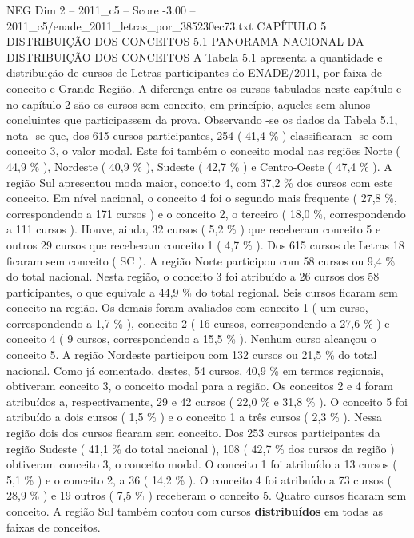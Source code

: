 \begin{textsample}{NEG Dim 2 – 2011\_c5 – Score -3.00 – 2011\_c5/enade\_2011\_letras\_por\_385230ec73.txt}  \label{ex:f2_neg_083}
CAPÍTULO 5 DISTRIBUIÇÃO DOS CONCEITOS 5.1 PANORAMA NACIONAL DA DISTRIBUIÇÃO DOS CONCEITOS A Tabela 5.1 apresenta a quantidade e distribuição de cursos de Letras participantes do ENADE/2011, por faixa de conceito e Grande Região.
A diferença entre os cursos tabulados neste capítulo e no capítulo 2 são os cursos sem conceito, em princípio, aqueles sem alunos concluintes que participassem da prova.
Observando -se os dados da Tabela 5.1, nota -se que, dos 615 cursos participantes, 254 ( 41,4 \% ) classificaram -se com conceito 3, o valor modal.
Este foi também o conceito modal nas regiões Norte ( 44,9 \% ), Nordeste ( 40,9 \% ), Sudeste ( 42,7 \% ) e Centro-Oeste ( 47,4 \% ).
A região Sul apresentou moda maior, conceito 4, com 37,2 \% dos cursos com este conceito.
Em nível nacional, o conceito 4 foi o segundo mais frequente ( 27,8 \%, correspondendo a 171 cursos ) e o conceito 2, o terceiro ( 18,0 \%, correspondendo a 111 cursos ).
Houve, ainda, 32 cursos ( 5,2 \% ) que receberam conceito 5 e outros 29 cursos que receberam conceito 1 ( 4,7 \% ).
Dos 615 cursos de Letras 18 ficaram sem conceito ( SC ).
A região Norte participou com 58 cursos ou 9,4 \% do total nacional.
Nesta região, o conceito 3 foi atribuído a 26 cursos dos 58 participantes, o que equivale a 44,9 \% do total regional.
Seis cursos ficaram sem conceito na região.
Os demais foram avaliados com conceito 1 ( um curso, correspondendo a 1,7 \% ), conceito 2 ( 16 cursos, correspondendo a 27,6 \% ) e conceito 4 ( 9 cursos, correspondendo a 15,5 \% ).
Nenhum curso alcançou o conceito 5.
A região Nordeste participou com 132 cursos ou 21,5 \% do total nacional.
Como já comentado, destes, 54 cursos, 40,9 \% em termos regionais, obtiveram conceito 3, o conceito modal para a região.
Os conceitos 2 e 4 foram atribuídos a, respectivamente, 29 e 42 cursos ( 22,0 \% e 31,8 \% ).
O conceito 5 foi atribuído a dois cursos ( 1,5 \% ) e o conceito 1 a três cursos ( 2,3 \% ).
Nessa região dois dos cursos ficaram sem conceito.
Dos 253 cursos participantes da região Sudeste ( 41,1 \% do total nacional ), 108 ( 42,7 \% dos cursos da região ) obtiveram conceito 3, o conceito modal.
O conceito 1 foi atribuído a 13 cursos ( 5,1 \% ) e o conceito 2, a 36 ( 14,2 \% ).
O conceito 4 foi atribuído a 73 cursos ( 28,9 \% ) e 19 outros ( 7,5 \% ) receberam o conceito 5.
Quatro cursos ficaram sem conceito.
A região Sul também contou com cursos \textbf{distribuídos} em todas as faixas de conceitos.

\end{textsample}
